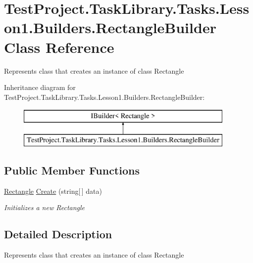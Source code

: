 \hypertarget{class_test_project_1_1_task_library_1_1_tasks_1_1_lesson1_1_1_builders_1_1_rectangle_builder}{}\section{Test\+Project.\+Task\+Library.\+Tasks.\+Lesson1.\+Builders.\+Rectangle\+Builder Class Reference}
\label{class_test_project_1_1_task_library_1_1_tasks_1_1_lesson1_1_1_builders_1_1_rectangle_builder}


Represents class that creates an instance of class Rectangle  


Inheritance diagram for Test\+Project.\+Task\+Library.\+Tasks.\+Lesson1.\+Builders.\+Rectangle\+Builder\+:\begin{figure}[H]
\begin{center}
\leavevmode
\includegraphics[height=2.000000cm]{class_test_project_1_1_task_library_1_1_tasks_1_1_lesson1_1_1_builders_1_1_rectangle_builder}
\end{center}
\end{figure}
\subsection*{Public Member Functions}
\begin{DoxyCompactItemize}
\item 
\mbox{\hyperlink{class_test_project_1_1_task_library_1_1_tasks_1_1_lesson1_1_1_models_1_1_rectangle}{Rectangle}} \mbox{\hyperlink{class_test_project_1_1_task_library_1_1_tasks_1_1_lesson1_1_1_builders_1_1_rectangle_builder_af15f46e36e73a3d2f718ceb2856a2377}{Create}} (string\mbox{[}$\,$\mbox{]} data)
\begin{DoxyCompactList}\small\item\em Initializes a new Rectangle \end{DoxyCompactList}\end{DoxyCompactItemize}


\subsection{Detailed Description}
Represents class that creates an instance of class Rectangle 



